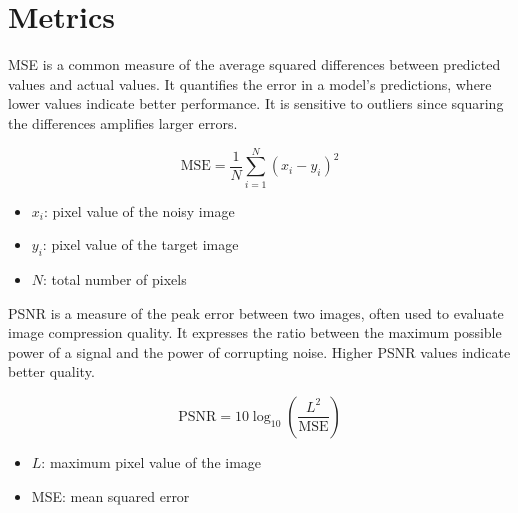 \section{Metrics}

\Gls{MSE} is a common measure of the average squared differences between predicted values and actual values. It quantifies the error in a model’s predictions, where lower values indicate better performance. It is sensitive to outliers since squaring the differences amplifies larger errors.

\begin{note}
    {}
    \begin{equation}
        \text{MSE} = \frac{1}{N} \sum_{i=1}^{N} (x_i - y_i)^2
    \end{equation}
    \begin{itemize}
        \item $x_i$: pixel value of the noisy image
        \item $y_i$: pixel value of the target image
        \item $N$: total number of pixels
    \end{itemize}
\end{note}

\Gls{PSNR} is a measure of the peak error between two images, often used to evaluate image compression quality. It expresses the ratio between the maximum possible power of a signal and the power of corrupting noise. Higher PSNR values indicate better quality.

\begin{note}
    {}
    \begin{equation}    
        \text{PSNR} = 10 \log_{10} \left( \frac{L^2}{\text{MSE}} \right)
    \end{equation}
    \begin{itemize}
        \item $L$: maximum pixel value of the image
        \item \gls{MSE}: mean squared error
    \end{itemize}
\end{note}


